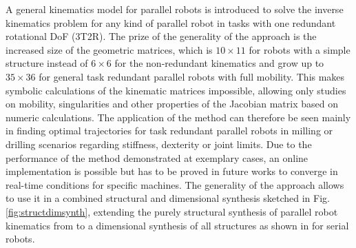 \documentclass[robotics,article,submit,moreauthors,pdftex]{Definitions/mdpi}
\begin{document}
A general kinematics model for parallel robots is introduced to solve the inverse kinematics problem for any kind of parallel robot in tasks with one redundant rotational DoF (3T2R).
The prize of the generality of the approach is the increased size of the geometric matrices, which is $10 \times 11$ for robots with a simple structure instead of $6\times6$ for the non-redundant kinematics and grow up to $35 \times 36$ for general task redundant parallel robots with full mobility.
This makes symbolic calculations of the kinematic matrices impossible, allowing only studies on mobility, singularities and other properties of the Jacobian matrix based on numeric calculations.
The application of the method can therefore be seen mainly in finding optimal trajectories for task redundant parallel robots in milling or drilling scenarios regarding stiffness, dexterity or joint limits.
%
Due to the performance of the method demonstrated at exemplary cases, an online implementation is possible but has to be proved in future works to converge in real-time conditions for specific machines.
The generality of the approach allows to use it in a combined structural and dimensional synthesis sketched in Fig.\,\ref{fig:structdimsynth}, extending the purely structural synthesis of parallel robot kinematics from \cite{Gogu2008,KongGos2005} to a dimensional synthesis of all structures as shown in \cite{RamirezKotOrt2015} for serial robots.

%
%
%
\end{document}
